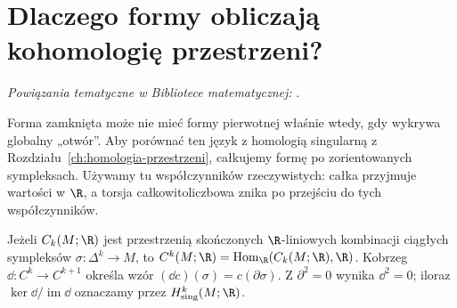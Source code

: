 \section{Dlaczego formy obliczają kohomologię przestrzeni?}
\label{sec:twierdzenie-de-rhama}

\noindent\emph{Powiązania tematyczne w Bibliotece matematycznej:} .


Forma zamknięta może nie mieć formy pierwotnej właśnie wtedy,
gdy wykrywa globalny „otwór”. Aby porównać ten język
z homologią singularną z Rozdziału~\ref{ch:homologia-przestrzeni},
całkujemy formę po zorientowanych sympleksach.
Używamy tu współczynników rzeczywistych: całka przyjmuje
wartości w $\R$, a torsja całkowitoliczbowa znika po
przejściu do tych współczynników.

\begin{definicja}
\label{def:singular-cohom-r}
Jeżeli $C_k(M;\R)$ jest przestrzenią skończonych
$\R$-liniowych kombinacji ciągłych sympleksów
$\sigma:\Delta^k\to M$, to
$C^k(M;\R)=\operatorname{Hom}_{\R}(C_k(M;\R),\R)$.
Kobrzeg $\dd:C^k\to C^{k+1}$ określa wzór
$(\dd c)(\sigma)=c(\partial\sigma)$.
Z $\partial^2=0$ wynika $\dd^2=0$; iloraz
$\ker\dd/\operatorname{im}\dd$ oznaczamy przez
$H^k_{\mathrm{sing}}(M;\R)$.
\end{definicja}

